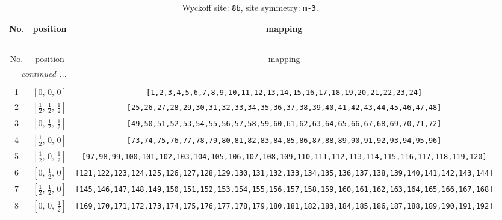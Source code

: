 \documentclass[fleqn,8pt]{jsarticle}
\begin{document}
\renewcommand{\arraystretch}{1.2}
\begin{longtable}{ccc}
\caption{Wyckoff site: {\tt 8b}, site symmetry: {\tt m-3.}}
 \\
 \hline \hline
No. & position & mapping \\ \hline \endfirsthead

\multicolumn{2}{l}{\tablename\ \thetable{}} \\
 \hline \hline
No. & position & mapping \\ \hline \endhead

 \hline \hline
\multicolumn{2}{r}{\footnotesize\it continued ...} \\ \endfoot

 \hline \hline
\multicolumn{2}{r}{} \\ \endlastfoot

1 & $\left[ 0,\, 0,\, 0 \right]$ & {\tt [1,2,3,4,5,6,7,8,9,10,11,12,13,14,15,16,17,18,19,20,21,22,23,24]} \\ \hline
2 & $\left[ \frac{1}{2},\, \frac{1}{2},\, \frac{1}{2} \right]$ & {\tt [25,26,27,28,29,30,31,32,33,34,35,36,37,38,39,40,41,42,43,44,45,46,47,48]} \\ \hline
3 & $\left[ 0,\, \frac{1}{2},\, \frac{1}{2} \right]$ & {\tt [49,50,51,52,53,54,55,56,57,58,59,60,61,62,63,64,65,66,67,68,69,70,71,72]} \\ \hline
4 & $\left[ \frac{1}{2},\, 0,\, 0 \right]$ & {\tt [73,74,75,76,77,78,79,80,81,82,83,84,85,86,87,88,89,90,91,92,93,94,95,96]} \\ \hline
5 & $\left[ \frac{1}{2},\, 0,\, \frac{1}{2} \right]$ & {\tt [97,98,99,100,101,102,103,104,105,106,107,108,109,110,111,112,113,114,115,116,117,118,119,120]} \\ \hline
6 & $\left[ 0,\, \frac{1}{2},\, 0 \right]$ & {\tt [121,122,123,124,125,126,127,128,129,130,131,132,133,134,135,136,137,138,139,140,141,142,143,144]} \\ \hline
7 & $\left[ \frac{1}{2},\, \frac{1}{2},\, 0 \right]$ & {\tt [145,146,147,148,149,150,151,152,153,154,155,156,157,158,159,160,161,162,163,164,165,166,167,168]} \\ \hline
8 & $\left[ 0,\, 0,\, \frac{1}{2} \right]$ & {\tt [169,170,171,172,173,174,175,176,177,178,179,180,181,182,183,184,185,186,187,188,189,190,191,192]} \\
\end{longtable}
\renewcommand{\arraystretch}{1.2}
\end{document}
